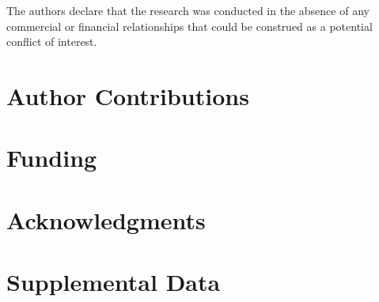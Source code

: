\documentclass[utf8]{frontiersSCNS} %
\begin{document}
The authors declare that the research was conducted in the absence of any
commercial or financial relationships that could be construed as a potential
conflict of interest.

\section*{Author Contributions}


\section*{Funding}

\section*{Acknowledgments}

\section*{Supplemental Data}
%
%
%
\end{document}
